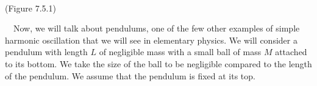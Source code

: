 \
\
\
\begin{center}
(Figure 7.5.1)
\end{center}
\ 
\
Now, we will talk about pendulums, one of the few other examples of simple harmonic oscillation that we will see in elementary physics. We will consider a pendulum with length $L$ of negligible mass with a small ball of mass $M$ attached to its bottom. We take the size of the ball to be negligible compared to the length of the pendulum. We assume that the pendulum is fixed at its top. 
